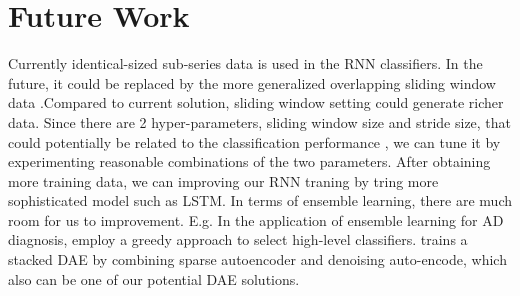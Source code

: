 \section{Future Work}

Currently identical-sized sub-series data is used in the RNN classifiers. In the future, it could be replaced by the more generalized overlapping sliding window data .Compared to current solution, sliding window setting could generate richer data. Since there are 2 hyper-parameters, sliding window size and stride size, that could potentially be related to the classification performance \cite{wee15}, we can tune it by experimenting reasonable combinations of the two parameters. After obtaining more training data, we can improving our RNN traning by tring more sophisticated model such as LSTM. In terms of ensemble learning, there are much room for us to improvement. E.g. In the application of ensemble learning for AD diagnosis, \textcite{liu14} employ a greedy approach to select high-level classifiers. \cite{shi17} trains a stacked DAE by combining  sparse autoencoder and denoising auto-encode, which also can be one of our potential DAE solutions. 



